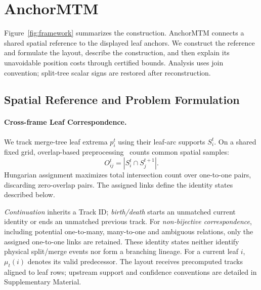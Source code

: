 \documentclass[review]{vgtc}
\begin{document}
\section{AnchorMTM}\label{sec:method}
Figure~\ref{fig:framework} summarizes the construction. AnchorMTM connects a shared spatial reference to the displayed leaf anchors. We construct the reference and formulate the layout, describe the construction, and then explain its unavoidable position costs through certified bounds. Analysis uses join convention; split-tree scalar signs are restored after reconstruction.

\subsection{Spatial Reference and Problem Formulation}\label{sec:reference}
\paragraph{Cross-frame Leaf Correspondence.}
We track merge-tree leaf extrema $p_i^t$ using their leaf-arc supports $S_i^t$. On a shared fixed grid, overlap-based preprocessing~\cite{STMTM:2026} counts common spatial samples:
\begin{equation}\label{eq:overlap}
 O_{ij}^t=|S_i^t\cap S_j^{t+1}|.
\end{equation}
Hungarian assignment maximizes total intersection count over one-to-one pairs, discarding zero-overlap pairs. The assigned links define the identity states described below.

\emph{Continuation} inherits a Track ID; \emph{birth/death} starts an unmatched current identity or ends an unmatched previous track. For \emph{non-bijective correspondence}, including potential one-to-many, many-to-one and ambiguous relations, only the assigned one-to-one links are retained. These identity states neither identify physical split/merge events nor form a branching lineage. For a current leaf $i$, $\mu_t(i)$ denotes its valid predecessor. The layout receives precomputed tracks aligned to leaf rows; upstream support and confidence conventions are detailed in Supplementary Material.

\end{document}
